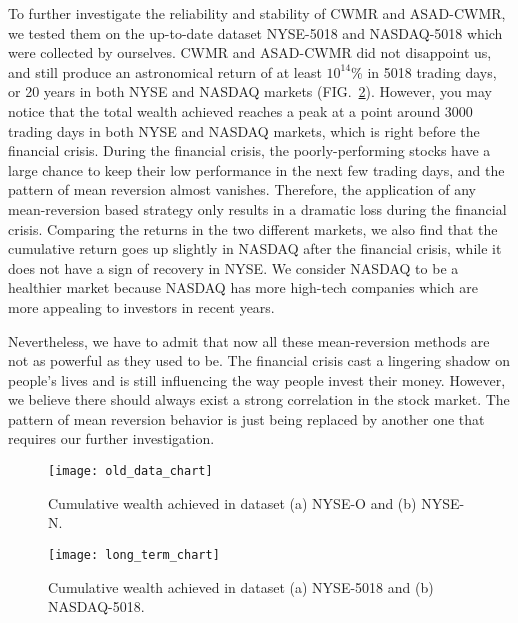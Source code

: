 To further investigate the reliability and stability of CWMR and ASAD-CWMR, we tested them on the up-to-date dataset NYSE-5018 and NASDAQ-5018 which were collected by ourselves. CWMR and ASAD-CWMR did not disappoint us, and still produce an astronomical return of at least $10^{14}$\% in 5018 trading days, or 20 years in both NYSE and NASDAQ markets (FIG.~\ref{fig:long_term_chart}). However, you may notice that the total wealth achieved reaches a peak at a point around 3000 trading days in both NYSE and NASDAQ markets, which is right before the financial crisis. During the financial crisis, the poorly-performing stocks have a large chance to keep their low performance in the next few trading days, and the pattern of mean reversion almost vanishes. Therefore, the application of any mean-reversion based strategy only results in a dramatic loss during the financial crisis. Comparing the returns in the two different markets, we also find that the cumulative return goes up slightly in NASDAQ after the financial crisis, while it does not have a sign of recovery in NYSE. We consider NASDAQ to be a healthier market because NASDAQ has more high-tech companies which are more appealing to investors in recent years.

Nevertheless, we have to admit that now all these mean-reversion methods are not as powerful as they used to be. The financial crisis cast a lingering shadow on people's lives and is still influencing the way people invest their money. However, we believe there should always exist a strong correlation in the stock market. The pattern of mean reversion behavior is just being replaced by another one that requires our further investigation. 

\begin{figure}
\texttt{[image: old\_data\_chart]}
\caption{
\label{fig:old_data_chart}
Cumulative wealth achieved in dataset (a) NYSE-O and (b) NYSE-N.
}
\end{figure}

\begin{figure}
\texttt{[image: long\_term\_chart]}
\caption{
\label{fig:long_term_chart}
Cumulative wealth achieved in dataset (a) NYSE-5018 and (b) NASDAQ-5018.
}
\end{figure}
